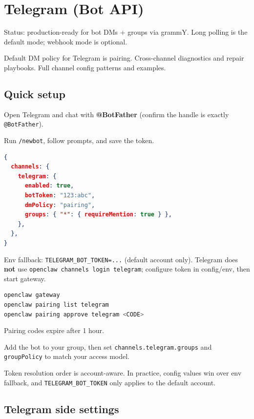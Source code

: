 \clearpage

\section{Telegram (Bot API)}


Status: production-ready for bot DMs + groups via grammY. Long polling is the default mode; webhook mode is optional.

Default DM policy for Telegram is pairing.
Cross-channel diagnostics and repair playbooks.
Full channel config patterns and examples.

\subsection{Quick setup}


Open Telegram and chat with \textbf{@BotFather} (confirm the handle is exactly \texttt{@BotFather}).

Run \texttt{/newbot}, follow prompts, and save the token.



\begin{lstlisting}[language=json]
{
  channels: {
    telegram: {
      enabled: true,
      botToken: "123:abc",
      dmPolicy: "pairing",
      groups: { "*": { requireMention: true } },
    },
  },
}
\end{lstlisting}


Env fallback: \texttt{TELEGRAM\_BOT\_TOKEN=...} (default account only).
Telegram does \textbf{not} use \texttt{openclaw channels login telegram}; configure token in config/env, then start gateway.



\begin{lstlisting}[language=bash]
openclaw gateway
openclaw pairing list telegram
openclaw pairing approve telegram <CODE>
\end{lstlisting}


Pairing codes expire after 1 hour.


Add the bot to your group, then set \texttt{channels.telegram.groups} and \texttt{groupPolicy} to match your access model.

Token resolution order is account-aware. In practice, config values win over env fallback, and \texttt{TELEGRAM\_BOT\_TOKEN} only applies to the default account.

\subsection{Telegram side settings}



